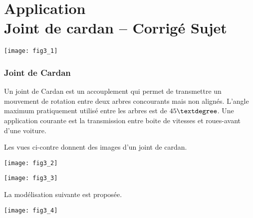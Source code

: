 \chapter*{Application  \\ 
Joint de cardan -- \ifprof Corrigé \else Sujet \fi}

\iflivret {} \else
\ifprof  {} \else \fi
\fi

\setcounter{question}{0}

\marginnote[1cm]{
}


\begin{marginfigure}
\texttt{[image: fig3\_1]}
\end{marginfigure}


\subsection*{Joint de Cardan}


Un joint de Cardan est un accouplement qui permet de transmettre un mouvement de rotation entre deux arbres concourants mais non alignés. L'angle maximum pratiquement utilisé entre les arbres est de $45\textdegree$. Une application courante est la transmission entre boite de vitesses  et roues-avant d’une voiture. 

Les vues ci-contre donnent des images d’un joint de cardan.

\begin{marginfigure}

\texttt{[image: fig3\_2]}  

\texttt{[image: fig3\_3]} 
\end{marginfigure}

La modélisation suivante est proposée.
\begin{center}
\texttt{[image: fig3\_4]} 
\end{center}

